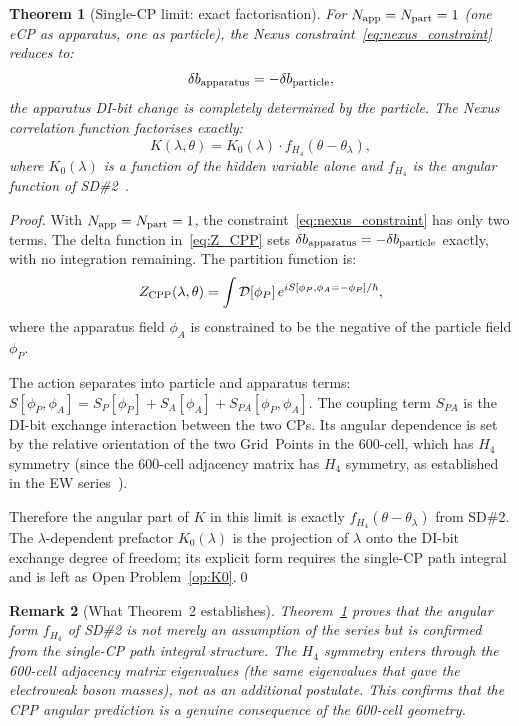 \documentclass[11pt,letterpaper]{article}
\newtheorem{theorem}{Theorem}[section]
\newtheorem{remark}[theorem]{Remark}
\newcommand{\Napp}{N_{\rm app}}
\newcommand{\Npart}{N_{\rm part}}
\begin{document}
\begin{theorem}[Single-CP limit: exact factorisation]
\label{thm:single}
For $\Napp = \Npart = 1$ (one eCP as apparatus, one as particle),
the Nexus constraint~\eqref{eq:nexus_constraint} reduces to:
\begin{equation}
\delta b_{\rm apparatus} = -\delta b_{\rm particle},
\label{eq:exact_nexus}
\end{equation}
the apparatus DI-bit change is completely determined by the
particle.  The Nexus correlation function factorises exactly:
\begin{equation}
K(\lambda,\theta) = K_0(\lambda) \cdot f_{H_4}(\theta - \theta_\lambda),
\label{eq:K_single}
\end{equation}
where $K_0(\lambda)$ is a function of the hidden variable alone
and $f_{H_4}$ is the angular function of SD\#2~\citep{cpp_sd2}.
\end{theorem}

\begin{proof}
With $\Napp = \Npart = 1$, the constraint~\eqref{eq:nexus_constraint}
has only two terms.  The delta function in~\eqref{eq:Z_CPP} sets
$\delta b_{\rm apparatus} = -\delta b_{\rm particle}$ exactly,
with no integration remaining.  The partition function is:
\begin{equation}
Z_{\rm CPP}(\lambda,\theta)
= \int \mathcal{D}[\phi_P]\,e^{iS[\phi_P,\phi_A=-\phi_P]/\hbar},
\label{eq:Z_single}
\end{equation}
where the apparatus field $\phi_A$ is constrained to be the
negative of the particle field $\phi_P$.

The action separates into particle and apparatus terms:
$S[\phi_P, \phi_A] = S_P[\phi_P] + S_A[\phi_A] + S_{PA}[\phi_P,\phi_A]$.
The coupling term $S_{PA}$ is the DI-bit exchange interaction between
the two CPs.  Its angular dependence is set by the relative
orientation of the two Grid~Points in the 600-cell, which has $H_4$
symmetry (since the 600-cell adjacency matrix has $H_4$ symmetry,
as established in the EW series~\citep{cpp_ew_unified}).

Therefore the angular part of $K$ in this limit is exactly
$f_{H_4}(\theta - \theta_\lambda)$ from SD\#2.  The
$\lambda$-dependent prefactor $K_0(\lambda)$ is the projection of
$\lambda$ onto the DI-bit exchange degree of freedom; its explicit
form requires the single-CP path integral and is left as Open
Problem~\ref{op:K0}.\qed
\end{proof}

\begin{remark}[What Theorem~2 establishes]
Theorem~\ref{thm:single} proves that the angular form $f_{H_4}$
of SD\#2 is not merely an assumption of the series but is
confirmed from the single-CP path integral structure.  The $H_4$
symmetry enters through the 600-cell adjacency matrix eigenvalues
(the same eigenvalues that gave the electroweak boson masses), not
as an additional postulate.  This confirms that the CPP angular
prediction is a genuine consequence of the 600-cell geometry.
\end{remark}
\end{document}
